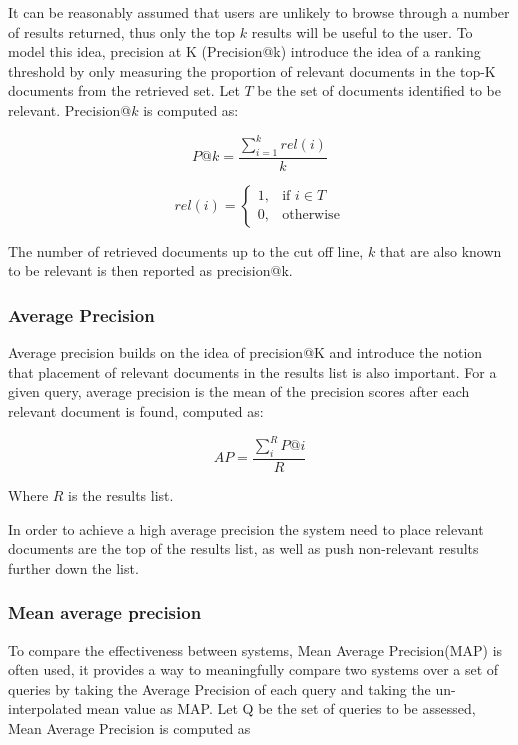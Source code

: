 It can be reasonably assumed that users are unlikely to browse through a number of results returned, thus only the top $k$ results will be useful to the user. To model this idea,  precision at K (Precision@k) introduce the idea of a ranking threshold by only measuring the proportion of relevant documents in the top-K documents from the retrieved set. Let $T$ be the set of documents identified to be relevant. Precision@$k$ is computed as:


\begin{equation}
P@k =  \frac{\sum_{i=1}^{k} rel(i)}{k}
\end{equation}

\begin{equation}
rel(i)=
\begin{cases}
1, & \text{if } i\in T\  \\
0, & \text{otherwise}
\end{cases}
\end{equation}


The number of retrieved documents up to the cut off line, $k$ that are also known to be relevant is then reported as precision@k.

\subsubsection{Average Precision}
Average precision builds on the idea of precision@K and introduce the notion that placement of relevant documents in the results list is also important. For a given query, average precision is the mean of the precision scores after each relevant document is found, computed as:

\begin{equation}
	AP = \frac{\sum_{i}^{R} P@i}{R} 
\end{equation}

Where $R$ is the results list. 

In order to achieve a high average precision the system need to place relevant documents are the top of the results list, as well as push non-relevant results further down the list. 



\subsubsection{Mean average precision}
To compare the effectiveness between systems, Mean Average Precision(MAP) is often used, it provides a way to meaningfully compare two systems over a set of queries by taking the Average Precision of each query and taking the un-interpolated mean value as MAP. Let Q be the set of queries to be assessed, Mean Average Precision is computed as

